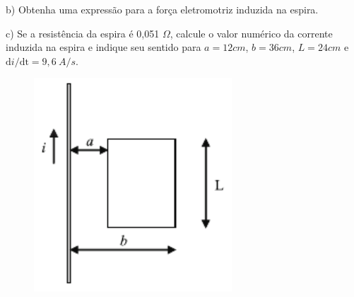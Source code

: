 \begin{enumerate}[start=1,label={\bfseries Q\arabic*.}]
\resposta

b) Obtenha uma expressão para a força eletromotriz induzida na espira.

\resposta

c) Se a resistência da espira é 0,051 $\Omega$, calcule o valor numérico da corrente induzida na espira e indique seu sentido para $a = 12 cm$, $b = 36 cm$, $L = 24 cm$ e$\mathrm{d} i/\mathrm{dt} = 9,6 \ A/s$.

\begin{figure}[H]
\centering
\includegraphics[scale=0.7]{eletromag-img/barrae.png}
\end{figure}

\resposta




\end{enumerate}






